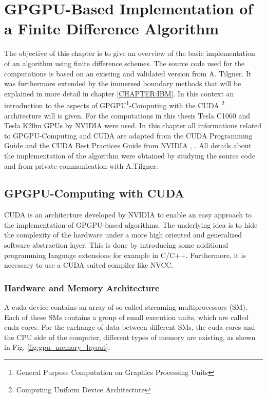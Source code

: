 \chapter[ GPGPU-Based Implementation of a Finite Difference Algorithm]{GPGPU-Based Implementation of \\ a Finite Difference Algorithm}

\label{CHAPTER:CUDA}

The objective of this chapter is to give an overview of the basic implementation of an algorithm using finite difference schemes.
The source code used for the computations is based on an existing and validated version from A. Tilgner.
It was furthermore extended by the immersed boundary methods that will be explained in more detail in chapter \ref{CHAPTER:IBM}.
In this context an introduction to the aspects of GPGPU\footnote{General Purpose Computation on Graphics Processing Units}-Computing
with the CUDA \footnote{Computing Uniform Device Architecture} architecture will is given.
For the computations in this thesis Tesla C1060 and Tesla K20m GPUs by NVIDIA were used. %
In this chapter all informations related to GPGPU-Computing and CUDA are adapted from the CUDA Programming Guide and the CUDA Best Practices Guide from NVIDIA
\citep{CUDAPG}, \citep{CUDABP}. All details about the implementation of the algorithm were obtained by studying the source code
and from private communication with A.Tilgner.

\section{GPGPU-Computing with CUDA}

CUDA is an architecture developed by NVIDIA to enable an easy approach to the implementation of GPGPU-based algorithms.
The underlying idea is to hide the complexity of the hardware under a more high oriented and generalized software abstraction layer.
This is done by introducing some additional programming language extensions for example in C/C++.
Furthermore, it is necessary to use a CUDA suited compiler like NVCC.

\subsection{Hardware and Memory Architecture}

A cuda device contains an array of so called streaming multiprocessors (SM).
Each of these SMs contains a group of small execution units, which are called cuda cores.
For the exchange of data between different SMs, the cuda cores and the CPU side of the computer, different
types of memory are existing, as shown  in Fig.  \ref{fig:gpu_memory_layout}.
\newpage

